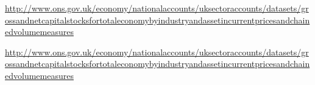 



\url{http://www.ons.gov.uk/economy/nationalaccounts/uksectoraccounts/datasets/grossandnetcapitalstocksfortotaleconomybyindustryandassetincurrentpricesandchainedvolumemeasures}

\newpage


\url{http://www.ons.gov.uk/economy/nationalaccounts/uksectoraccounts/datasets/grossandnetcapitalstocksfortotaleconomybyindustryandassetincurrentpricesandchainedvolumemeasures}

